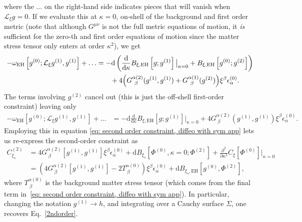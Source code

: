 \documentclass[]{jkpaper}
\theoremstyle{plain}
\theoremstyle{definition}
\newcommand{\sd}{\mathrm {d}}
\newcommand{\sL}{\mathcal{L}}
\begin{document}
where the $\dots$ on the right-hand side indicates pieces that will vanish when $\sL_\xi g=0$. If we evaluate this at $\kappa=0$, on-shell of the background and first order metric (note that although $G^{\mu\nu}$ is not the full metric equations of motion, it \textit{is} sufficient for the zero-th and first order equations of motion since the matter stress tensor only enters at order $\kappa^2$), we get
\begin{equation}\begin{split}\label{eq: intermediate omega EH}
    -\omega_{\text{EH}}\left[g^{(0)};\sL_\xi  g^{(1)}, g^{(1)}\right]+\dots
    &=
    -\sd \left(\frac{\sd}{\sd\kappa}B_{\xi,\text{EH}}\left[g;g^{(1)}\right]\big|_{\kappa=0}+B_{\xi,\text{EH}}\left[g^{(0)};g^{(2)}\right]\right)\\
    &\qquad
    +4 \qty(G^{\alpha(2)}_{~\beta}(g^{(1)},g^{(1)}) + G^{\alpha(1)}_{~\beta}(g^{(2)})) \xi^\beta\epsilon^{(0)}_\alpha.
\end{split}\end{equation}
The terms involving $g^{(2)}$ cancel out (this is just the off-shell first-order constraint) leaving only
\begin{equation}\begin{split}\label{eq: final omega EH}
    -\omega_{\text{EH}}\left[g^{(0)};\sL_\xi g^{(1)}, g^{(1)}\right]+\dots
    &=
    -\sd \frac{\sd}{\sd\kappa}B_{\xi,\text{EH}}\left[g;g^{(1)}\right]\big|_{\kappa=0}
    +4 G^{\alpha(2)}_{~\beta}(g^{(1)},g^{(1)})\xi^\beta\epsilon^{(0)}_\alpha.
\end{split}\end{equation}
Employing this in equation \eqref{eq: second order constraint, diffeo with sym app} lets us re-express the second-order constraint as
\begin{equation}\begin{split}
     C_{\xi_s}^{(2)}
      &=4G^{\alpha(2)}_{~\beta}[g^{(1)},g^{(1)}]\xi^\beta\epsilon^{(0)}_{\alpha}
      +\sd B_{\xi_s}\left[\Phi^{(0)},\kappa=0;\Phi^{(2)}\right]
      +\frac{\partial^2}{\partial\kappa^2}C_\xi[\Phi^{(0)}]\bigg|_{\kappa=0}\\
      &=\left(4G^{\alpha(2)}_{~\beta}[g^{(1)},g^{(1)}]-2 T^{\alpha(0)}_{~\beta}\right)\xi^\beta\epsilon^{(0)}_{\alpha}
      +\sd B_{\xi_s,\text{EH}}\left[g^{(0)},\Phi^{(2)}\right],
\end{split}\end{equation}
where $T^{\alpha(0)}_{~\beta}$ is the background matter stress tensor (which comes from the final term in~\eqref{eq: second order constraint, diffeo with sym app}). In particular, changing the notation $g^{(1)}\to h$, and integrating over a Cauchy surface $\Sigma$, one recovers Eq.~\eqref{2ndorder}.




\printbibliography
\end{document}
